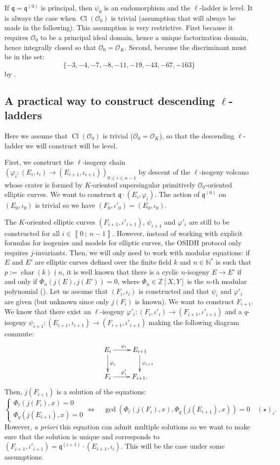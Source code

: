 \documentclass[a4paper,10pt]{report}
\theoremstyle{definition}
\theoremstyle{plain}
\theoremstyle{definition}
\newcommand{\N}{\mathbb{N}}
\newcommand{\Z}{\mathbb{Z}}
\newcommand{\mO}{\mathcal{O}}
\renewcommand{\i}[2]{\left\llbracket #1~;~#2\right\rrbracket}
\renewcommand{\(}{\left(}
\renewcommand{\)}{\right)}
\newcommand{\mf}[1]{\mathfrak{#1}}
\newcommand{\mfq}{\mathfrak{q}}
\DeclareMathOperator{\Cl}{Cl}
\DeclareMathOperator{\Char}{char}%
\begin{document}
If $\mfq=\mfq^{(0)}$ is principal, then $\psi_0$ is an endomorphism and the $\ell$-ladder is level. It is always the case when $\Cl(\mO_0)$ is trivial (assumption that will always be made in the following). This assumption is very restrictive. First because it requires $\mO_0$ to be a principal ideal domain, hence a unique factorization domain, hence integrally closed so that $\mO_0=\mO_K$. Second, because the discriminant must be in the set:
\[\{-3,-4,-7,-8,-11,-19,-43,-67,-163\}\]
by \cite[Theorem 7.30.(i)]{Cox}.


\subsection{A practical way to construct descending $\ell$-ladders}\label{paragraph 1}

Here we assume that $\Cl(\mO_0)$ is trivial ($\mO_0=\mO_K$), so that the descending $\ell$-ladder we will construct will be level.

First, we construct the $\ell$-isogeny chain $(\varphi_i: (E_i,\iota_i)\longrightarrow (E_{i+1},\iota_{i+1}))_{0\leq i\leq n-1}$ by descent of the $\ell$-isogeny volcano whose crater is formed by $K$-oriented supersingular primitively $\mO_0$-oriented elliptic curves.  We want to construct $\mf{q}\cdot(E_i,\varphi_i)$.  The action of $\mfq^{(0)}$ on $(E_0,\iota_0)$ is trivial so we have $(F_0,\iota'_0)=(E_0,\iota_0)$. 

The $K$-oriented elliptic curves $(F_{i+1},\iota'_{i+1})$, $\psi_{i+1}$ and $\varphi'_i$ are still to be constructed for all $i\in\i{0}{n-1}$. However, instead of working with explicit formulas for isogenies and models for elliptic curves, the OSIDH protocol only requires $j$-invariants. Then, we will only need to work with modular equations: if $E$ and $E'$ are elliptic curves defined over the finite field $k$ and $n\in\N^*$ is such that $p:=\Char(k)\nmid n$, it is well known that there is a cyclic $n$-isogeny $E\longrightarrow E'$ if and only if $\Phi_n(j(E),j(E'))=0$, where $\Phi_n\in\Z[X,Y]$ is the $n$-th modular polynomial (\cite[Theorem V.5]{Lang_EF}). Let us assume that $(F_i,\iota_i)$ is constructed and that $\psi_i$ and $\varphi'_i$ are given (but unknown since only $j(F_i)$ is known).  We want to construct $F_{i+1}$. We know that there exist an $\ell$-isogeny $\varphi'_i: (F_i,\iota'_i)\longrightarrow (F_{i+1},\iota'_{i+1})$ and a $q$-isogeny $\psi_{i+1}: (E_{i+1},\iota_{i+1})\longrightarrow (F_{i+1},\iota'_{i+1})$ making the following diagram commute:
\[\xymatrix{
E_i \ar[d]^{\psi_i} \ar[r]^{\varphi_i} & E_{i+1}\ar[d]^{\psi_{i+1}} \\
F_i \ar[r]^{\varphi'_i} & F_{i+1}.
}\]
Then, $j(F_{i+1})$ is a solution of the equations:
\[\left\{\begin{array}{c}
\Phi_\ell(j(F_i),x)=0\\
\Phi_q(j(E_{i+1}),x)=0
\end{array}\right. \Longleftrightarrow \quad \gcd(\Phi_\ell(j(F_i),x),\Phi_q(j(E_{i+1}),x))=0\quad (\star)_i.\]
However, \emph{a priori} this equation can admit multiple solutions so we want to make sure that the solution is unique and corresponds to $(F_{i+1},\iota'_{i+1})=\mf{q}^{(i+1)}\cdot(E_{i+1},\iota_i)$. This will be the case under some assumptions.
\end{document}
